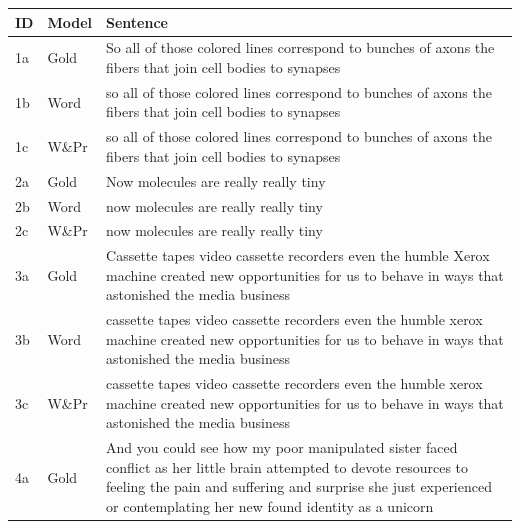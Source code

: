 \begin{table}[tbp]
\centering

\begin{tabular}{p{0.5cm}|l|p{12cm}}
\toprule
ID & Model & Sentence  \\
\midrule
1a & Gold & So all of those colored lines correspond to bunches of axons\mycirc{\textbf{,}} the fibers that join cell bodies to synapses\mycirc{\textbf{.}} \\
1b & Word & so all of those colored lines correspond to bunches of axons\mycirc{\textbf{,}} the fibers that join cell bodies to synapses\mycirc{\textbf{.}}  \\ 
1c & W\&Pr & so all of those colored lines correspond to bunches of axons the fibers that join cell bodies to synapses\mycirc{\textbf{.}}  \\
\midrule
2a & Gold & Now molecules are really\mycirc{\textbf{,}} really tiny\mycirc{\textbf{.}} \\
2b & Word & now\mycirc{\textbf{,}} molecules are really really tiny\mycirc{\textbf{.}}  \\
2c & W\&Pr & now\mycirc{\textbf{,}} molecules are really\mycirc{\textbf{,}} really tiny\mycirc{\textbf{.}} \\ 
\midrule
3a & Gold & Cassette tapes\mycirc{\textbf{,}} video cassette recorders\mycirc{\textbf{,}} even the humble Xerox machine created new opportunities for us to behave in ways that astonished the media business\mycirc{\textbf{.}} \\
3b & Word & cassette tapes\mycirc{\textbf{,}} video cassette recorders\mycirc{\textbf{,}} even the humble xerox machine\mycirc{\textbf{,}} created new opportunities for us to behave in ways that astonished the media business\mycirc{\textbf{.}} \\
3c & W\&Pr & cassette tapes\mycirc{\textbf{,}} video\mycirc{\textbf{,}} cassette recorders\mycirc{\textbf{,}} even the humble xerox machine created new opportunities for us to behave in ways that astonished the media business\mycirc{\textbf{.}}  \\ 
\midrule
4a & Gold & And you could see how my poor\mycirc{\textbf{,}} manipulated sister faced conflict\mycirc{\textbf{,}} as her little brain attempted to devote resources to feeling the pain and suffering and surprise she just experienced\mycirc{\textbf{,}} or contemplating her new found identity as a unicorn\mycirc{\textbf{.}} \\

\end{tabular}
\end{table}
